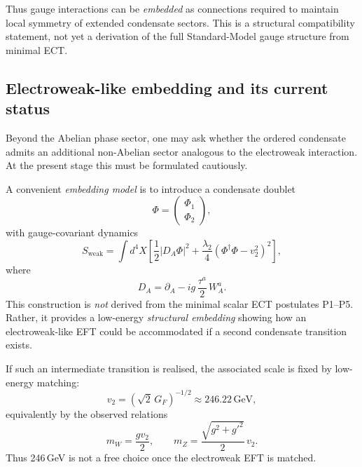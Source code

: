 \documentclass[11pt,a4paper]{article}
\numberwithin{equation}{section}
\begin{document}
Thus gauge interactions can be \emph{embedded} as connections required
to maintain local symmetry of extended condensate sectors.
This is a structural compatibility statement, not yet a derivation of
the full Standard-Model gauge structure from minimal ECT.

\subsection{Electroweak-like embedding and its current status}
\label{sec:ew_embedding}

Beyond the Abelian phase sector, one may ask whether the ordered
condensate admits an additional non-Abelian sector analogous to the
electroweak interaction.
At the present stage this must be formulated cautiously.

A convenient \emph{embedding model} is to introduce a condensate doublet
\begin{equation}
\Phi =
\begin{pmatrix}
\Phi_1 \\
\Phi_2
\end{pmatrix},
\end{equation}
with gauge-covariant dynamics
\begin{equation}
S_{\text{weak}}=
\int d^4X
\left[
\frac{1}{2}\lvert D_A\Phi\rvert^2
+
\frac{\lambda_2}{4}
\left(\Phi^\dagger\Phi - v_2^2\right)^2
\right],
\end{equation}
where
\begin{equation}
D_A = \partial_A - i g\,\frac{\tau^a}{2}\,W_A^a.
\end{equation}
This construction is \emph{not} derived from the minimal scalar ECT
postulates P1--P5.
Rather, it provides a low-energy \emph{structural embedding} showing how
an electroweak-like EFT could be accommodated if a second condensate
transition exists.

If such an intermediate transition is realised, the associated scale is
fixed by low-energy matching:
\begin{equation}
  v_2 = \left(\sqrt{2}\,G_F\right)^{-1/2} \approx 246.22\,\text{GeV},
\end{equation}
equivalently by the observed relations
\begin{equation}
  m_W = \frac{g v_2}{2},
  \qquad
  m_Z = \frac{\sqrt{g^2+g'^2}}{2}\,v_2.
\end{equation}
Thus 246\,GeV is not a free choice once the electroweak EFT is matched.
\end{document}
